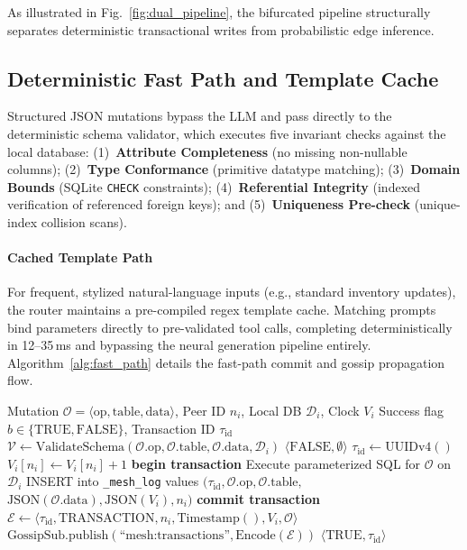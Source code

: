As illustrated in Fig.~\ref{fig:dual_pipeline}, the bifurcated pipeline structurally separates deterministic transactional writes from probabilistic edge inference.

\subsection{Deterministic Fast Path and Template Cache}
Structured JSON mutations bypass the LLM and pass directly to the deterministic schema validator, which executes five invariant checks against the local database: (1)~\textbf{Attribute Completeness} (no missing non-nullable columns); (2)~\textbf{Type Conformance} (primitive datatype matching); (3)~\textbf{Domain Bounds} (SQLite \texttt{CHECK} constraints); (4)~\textbf{Referential Integrity} (indexed verification of referenced foreign keys); and (5)~\textbf{Uniqueness Pre-check} (unique-index collision scans).

\paragraph{Cached Template Path}
For frequent, stylized natural-language inputs (e.g., standard inventory updates), the router maintains a pre-compiled regex template cache. Matching prompts bind parameters directly to pre-validated tool calls, completing deterministically in 12--35\,ms and bypassing the neural generation pipeline entirely. Algorithm~\ref{alg:fast_path} details the fast-path commit and gossip propagation flow.

\begin{algorithm}[!t]
\caption{Deterministic Fast-Path Commit and Propagation}
\label{alg:fast_path}
\begin{algorithmic}[1]
\Require Mutation $\mathcal{O} = \langle \text{op}, \text{table}, \text{data} \rangle$, Peer ID $n_i$, Local DB $\mathcal{D}_i$, Clock $V_i$
\Ensure Success flag $b \in \{\text{TRUE}, \text{FALSE}\}$, Transaction ID $\tau_{\text{id}}$
\State $\mathcal{V} \gets \text{ValidateSchema}(\mathcal{O}.\text{op}, \mathcal{O}.\text{table}, \mathcal{O}.\text{data}, \mathcal{D}_i)$
    \State \Return $\langle \text{FALSE}, \emptyset \rangle$
\EndIf
\State $\tau_{\text{id}} \gets \text{UUIDv4}()$
\State $V_i[n_i] \gets V_i[n_i] + 1$
\State \textbf{begin transaction}
\State Execute parameterized SQL for $\mathcal{O}$ on $\mathcal{D}_i$
\State INSERT into \texttt{\_mesh\_log} values $(\tau_{\text{id}}, \mathcal{O}.\text{op}, \mathcal{O}.\text{table},$
\State \quad $\text{JSON}(\mathcal{O}.\text{data}), \text{JSON}(V_i), n_i)$
\State \textbf{commit transaction}
\State $\mathcal{E} \gets \langle \tau_{\text{id}}, \text{TRANSACTION}, n_i, \text{Timestamp}(), V_i, \mathcal{O} \rangle$
\State $\text{GossipSub.publish}(\text{``mesh:transactions''}, \text{Encode}(\mathcal{E}))$
\State \Return $\langle \text{TRUE}, \tau_{\text{id}} \rangle$
\end{algorithmic}
\end{algorithm}

